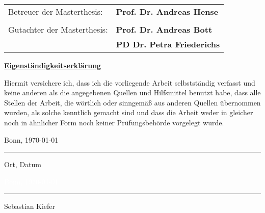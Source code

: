 \thispagestyle{empty}
\begin{center}
\begin{tabular}{ l l }
Betreuer der Masterthesis: & \textbf{Prof. Dr. Andreas Hense} \\
\\
Gutachter der Masterthesis: & \textbf{Prof. Dr. Andreas Bott} \\
& \textbf{PD Dr. Petra Friederichs} \\
\end{tabular}
\end{center}


\vspace*{\fill}
\large{\textbf{\underline{Eigenständigkeitserklärung}}}
\normalsize

\vskip 1cm

\noindent
Hiermit versichere ich, dass ich die vorliegende Arbeit selbstständig verfasst und keine anderen als die angegebenen Quellen und Hilfsmittel benutzt habe, dass alle Stellen der Arbeit, die wörtlich oder sinngemäß aus anderen Quellen übernommen wurden, als solche kenntlich gemacht sind und dass die Arbeit weder in gleicher noch in ähnlicher Form noch keiner Prüfungsbehörde vorgelegt wurde.

\vskip 2cm

\parbox{5.5cm}{\centering Bonn, \today
{\hrule height .5pt}
\strut \centering\footnotesize Ort, Datum} \hfill
\parbox{5.5cm}{\centering \textcolor{white}{\centering Bonn, \today} 
{\hrule height.5pt}
\strut \centering\footnotesize Sebastian Kiefer}
 
